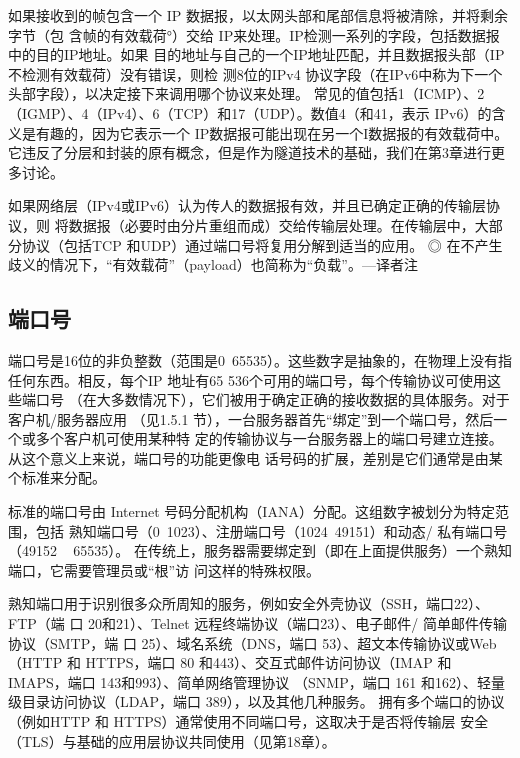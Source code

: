 如果接收到的帧包含一个 IP 数据报，以太网头部和尾部信息将被清除，并将剩余字节（包
含帧的有效载荷°）交给 IP来处理。IP检测一系列的字段，包括数据报中的目的IP地址。如果
目的地址与自己的一个IP地址匹配，并且数据报头部（IP 不检测有效载荷）没有错误，则检
测8位的IPv4 协议字段（在IPv6中称为下一个头部字段），以决定接下来调用哪个协议来处理。
常见的值包括1（ICMP）、2（IGMP）、4（IPv4）、6（TCP）和17（UDP）。数值4（和41，表示
IPv6）的含义是有趣的，因为它表示一个 IP数据报可能出现在另一个I数据报的有效载荷中。
它违反了分层和封装的原有概念，但是作为隧道技术的基础，我们在第3章进行更多讨论。

如果网络层（IPv4或IPv6）认为传人的数据报有效，并且已确定正确的传输层协议，则
将数据报（必要时由分片重组而成）交给传输层处理。在传输层中，大部分协议（包括TCP
和UDP）通过端口号将复用分解到适当的应用。
◎ 在不产生歧义的情况下，“有效载荷”（payload）也简称为“负载”。—译者注

\subsection{端口号}
端口号是16位的非负整数（范围是0~65535）。这些数字是抽象的，在物理上没有指
任何东西。相反，每个IP 地址有65 536个可用的端口号，每个传输协议可使用这些端口号
（在大多数情况下），它们被用于确定正确的接收数据的具体服务。对于客户机/服务器应用
（见1.5.1 节），一台服务器首先“绑定”到一个端口号，然后一个或多个客户机可使用某种特
定的传输协议与一台服务器上的端口号建立连接。从这个意义上来说，端口号的功能更像电
话号码的扩展，差别是它们通常是由某个标准来分配。

标准的端口号由 Internet 号码分配机构（IANA）分配。这组数字被划分为特定范围，包括
熟知端口号（0~1023）、注册端口号（1024~49151）和动态/ 私有端口号（49152 ~ 65535）。
在传统上，服务器需要绑定到（即在上面提供服务）一个熟知端口，它需要管理员或“根”访
问这样的特殊权限。

熟知端口用于识别很多众所周知的服务，例如安全外壳协议（SSH，端口22）、FTP（端
口 20和21）、Telnet 远程终端协议（端口23）、电子邮件/ 简单邮件传输协议（SMTP，端
口 25）、域名系统（DNS，端口 53）、超文本传输协议或Web（HTTP 和 HTTPS，端口 80
和443）、交互式邮件访问协议（IMAP 和 IMAPS，端口 143和993）、简单网络管理协议
（SNMP，端口 161 和162）、轻量级目录访问协议（LDAP，端口 389），以及其他几种服务。
拥有多个端口的协议（例如HTTP 和 HTTPS）通常使用不同端口号，这取决于是否将传输层
安全（TLS）与基础的应用层协议共同使用（见第18章）。

